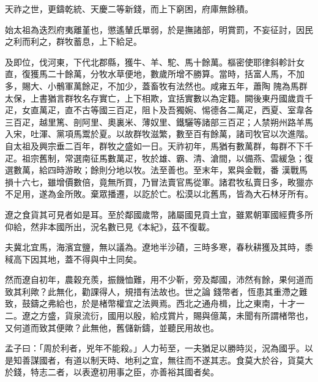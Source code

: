 \begin{pinyinscope}
 天祚之世，更鑄乾統、天慶二等新錢，而上下窮困，府庫無餘積。



 始太祖為迭烈府夷離堇也，懲遙輦氏單弱，於是撫諸部，明賞罰，不妄征討，因民之利而利之，群牧蓄息，上下給足。



 及即位，伐河東，下代北郡縣，獲牛、羊、駝、馬十餘萬。樞密使耶律斜軫計女直，復獲馬二十餘萬，分牧水草便地，數歲所增不勝算。當時，括富人馬，不加多，賜大、小鶻軍萬餘疋，不加少，蓋畜牧有法然也。咸雍五年，蕭陶
 隗為馬群太保，上書猶言群牧名存實亡，上下相欺，宜括實數以為定籍。闕後東丹國歲貢千疋，女直萬疋，直不古等國三百疋，阻卜及吾獨婉、惕德各二萬疋，西夏、室韋各三百疋，越里篤、剖阿里、奧裏米、薄奴里、鐵驪等諸部三百疋；人禁朔州路羊馬入宋，吐渾、黨項馬鬻於夏。以故群牧滋繁，數至百有餘萬，諸司牧官以次進階。自太祖及興宗垂二百年，群牧之盛如一日。天祚初年，馬猶有數萬群，每群不下千疋。祖宗舊制，常選南征馬數萬疋，牧於雄、霸、清、滄間，以備燕、雲緩急；復選數萬，給四時游畋；餘則分地以牧。法至善也。至末年，累與金戰，番
 漢戰馬損十六七，雖增價數倍，竟無所買，乃冒法賣官馬從軍。諸君牧私賣日多，畋獵亦不足用，遂為金所敗。棄眾播遷，以訖於亡。松漠以北舊馬，皆為大石林牙所有。



 遼之食貨其可見者如是耳。至於鄰國歲幣，諸屬國見貢土宜，雖累朝軍國經費多所仰給，然非本國所出，況名數已見《本紀》，茲不復載。



 夫冀北宜馬，海濱宜鹽，無以議為。遼地半沙磧，三時多寒，春秋耕獲及其時，黍稢高下因其地，蓋不得與中土同矣。



 然而遼自初年，農穀充羨，振饑恤難，用不少靳，旁及鄰國，沛然有餘，果何道而致其利歟？此無化，勸課得人，規措有法故也。世之論
 錢幣者，恆患其重滯之難致，鼓鑄之弗給也，於是楮幣權宜之法興焉。西北之通舟楫，比之東南，十才一二。遼之方盛，貨泉流衍，國用以殷，給戍賞片，賜與億萬，未聞有所謂楮幣也，又何道而致其便歟？此無他，舊儲新鑄，並聽民用故也。



 孟子曰：「周於利者，兇年不能殺。」人力茍至，一夫猶足以勝時災，況為國乎。以是知善謀國者，有道以制天時、地利之宜，無往而不遂其志。食莫大於谷，貨莫大於錢，特志二者，以表遼初用事之臣，亦善裕其國者矣。



\end{pinyinscope}